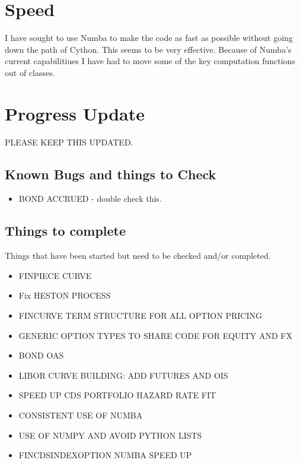 \documentclass[twoside,11pt]{book}
\begin{document}
\section{Speed}
I have sought to use Numba to make the code as fast as possible without going down the path of Cython. This seems to be very effective. Because of Numba's current capabilitiues I have had to move some of the key computation functions out of classes.

\section{Progress Update}
PLEASE KEEP THIS UPDATED.

\subsection{Known Bugs and things to Check}
\begin{itemize}
\item BOND ACCRUED - double check this.
\end{itemize}

\subsection{Things to complete}
Things that have been started but need to be checked and/or completed.
\begin{itemize}
\item FINPIECE CURVE
\item Fix HESTON PROCESS
\item FINCURVE TERM STRUCTURE FOR ALL OPTION PRICING
\item GENERIC OPTION TYPES TO SHARE CODE FOR EQUITY AND FX
\item BOND OAS
\item LIBOR CURVE BUILDING: ADD FUTURES AND OIS
\item SPEED UP CDS PORTFOLIO HAZARD RATE FIT
\item CONSISTENT USE OF NUMBA
\item USE OF NUMPY AND AVOID PYTHON LISTS
\item FINCDSINDEXOPTION NUMBA SPEED UP
\end{itemize}
\end{document}
